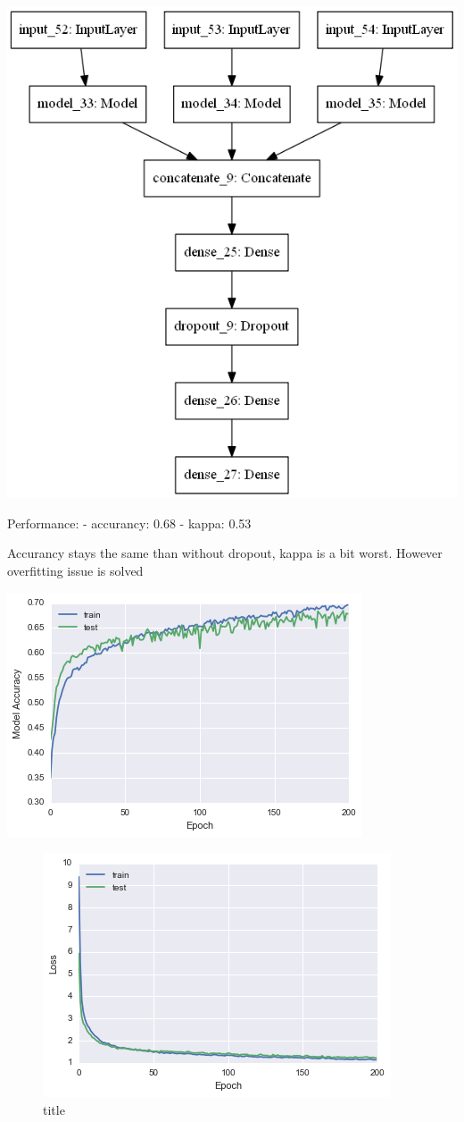 \documentclass[11pt]{article}
\makeatletter
\def\maxwidth{\ifdim\Gin@nat@width>\linewidth\linewidth
    \else\Gin@nat@width\fi}
\let\Oldincludegraphics\includegraphics
\renewcommand{\includegraphics}[1]{\Oldincludegraphics[width=.8\maxwidth]{#1}}
\makeatother
\begin{document}
\includegraphics{mergeModel1 with dropout.png}

Performance: - accurancy: 0.68 - kappa: 0.53

Accurancy stays the same than without dropout, kappa is a bit worst.
However overfitting issue is solved

\includegraphics{mergeModel1dropout_acc.png}

\begin{figure}
\centering
\includegraphics{mergeModel1dropout_loss.png}
\caption{title}
\end{figure}
\end{document}

